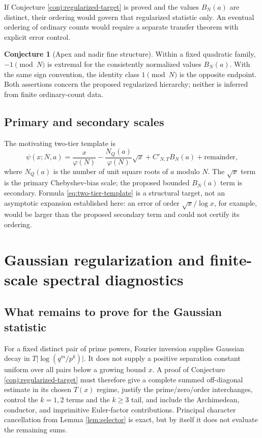 \documentclass[12pt,reqno]{amsart}
\theoremstyle{definition}
\newtheorem{conjecture}[theorem]{Conjecture}
\theoremstyle{remark}
\numberwithin{equation}{section}
\begin{document}
If Conjecture \ref{conj:regularized-target} is proved and the values $B_N(a)$
are distinct, their ordering would govern that regularized statistic only.
An eventual ordering of ordinary counts would require a separate transfer
theorem with explicit error control.

\begin{conjecture}[Apex and nadir fine structure]\label{conj:apex-nadir}
Within a fixed quadratic family, $-1\pmod N$ is extremal for the consistently
normalized values $B_N(a)$.  With the same sign convention, the identity class
$1\pmod N$ is the opposite endpoint.  Both assertions concern the proposed
regularized hierarchy; neither is inferred from finite ordinary-count data.
\end{conjecture}

\subsection{Primary and secondary scales}

The motivating two-tier template is
\begin{equation}\label{eq:two-tier-template}
 \psi(x;N,a)=\frac{x}{\varphi(N)}
 -\frac{N_Q(a)}{\varphi(N)}\sqrt{x}
 +C'_{N,T}B_N(a)+\text{remainder},
\end{equation}
where $N_Q(a)$ is the number of unit square roots of $a$ modulo $N$.
The $\sqrt{x}$ term is the primary Chebyshev-bias scale; the proposed bounded
$B_N(a)$ term is secondary.  Formula \eqref{eq:two-tier-template} is a
structural target, not an asymptotic expansion established here: an error of
order $\sqrt{x}/\log x$, for example, would be larger than the proposed
secondary term and could not certify its ordering.

\section{Gaussian regularization and finite-scale spectral diagnostics}
\label{sec:regularized-and-finite}

\subsection{What remains to prove for the Gaussian statistic}

For a fixed distinct pair of prime powers, Fourier inversion supplies Gaussian
decay in $T\lvert\log(q^m/p^k)\rvert$.  It does not supply a positive separation
constant uniform over all pairs below a growing bound $x$.  A proof of
Conjecture \ref{conj:regularized-target} must therefore give a complete summed
off-diagonal estimate in its chosen $T(x)$ regime, justify the prime/zero/order
interchanges, control the $k=1,2$ terms and the $k\ge3$ tail, and include the
Archimedean, conductor, and imprimitive Euler-factor contributions.  Principal
character cancellation from Lemma \ref{lem:selector} is exact, but by itself it
does not evaluate the remaining sums.
\end{document}
